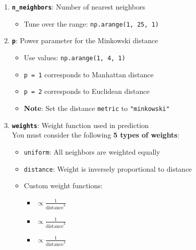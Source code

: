 \documentclass[
  letterpaper,
  DIV=11,
  numbers=noendperiod]{scrreprt}
\providecommand{\tightlist}{%
  \setlength{\itemsep}{0pt}\setlength{\parskip}{0pt}}\usepackage{longtable,booktabs,array}
\begin{document}
\begin{enumerate}
\def\labelenumi{\arabic{enumi}.}
\item
  \textbf{\texttt{n\_neighbors}}: Number of nearest neighbors

  \begin{itemize}
  \tightlist
  \item
    Tune over the range: \texttt{np.arange(1,\ 25,\ 1)}
  \end{itemize}
\item
  \textbf{\texttt{p}}: Power parameter for the Minkowski distance

  \begin{itemize}
  \tightlist
  \item
    Use values: \texttt{np.arange(1,\ 4,\ 1)}
  \item
    \texttt{p\ =\ 1} corresponds to Manhattan distance\\
  \item
    \texttt{p\ =\ 2} corresponds to Euclidean distance\\
  \item
    \textbf{Note}: Set the distance \texttt{metric} to
    \texttt{"minkowski"}
  \end{itemize}
\item
  \textbf{\texttt{weights}}: Weight function used in prediction\\
  You must consider the following \textbf{5 types of weights}:

  \begin{itemize}
  \tightlist
  \item
    \texttt{\textquotesingle{}uniform\textquotesingle{}}: All neighbors
    are weighted equally\\
  \item
    \texttt{\textquotesingle{}distance\textquotesingle{}}: Weight is
    inversely proportional to distance\\
  \item
    Custom weight functions:

    \begin{itemize}
    \tightlist
    \item
      \(\propto \frac{1}{\text{distance}^2}\)
    \item
      \(\propto \frac{1}{\text{distance}^3}\)
    \item
      \(\propto \frac{1}{\text{distance}^4}\)
    \end{itemize}
  \end{itemize}
\end{enumerate}
\end{document}
